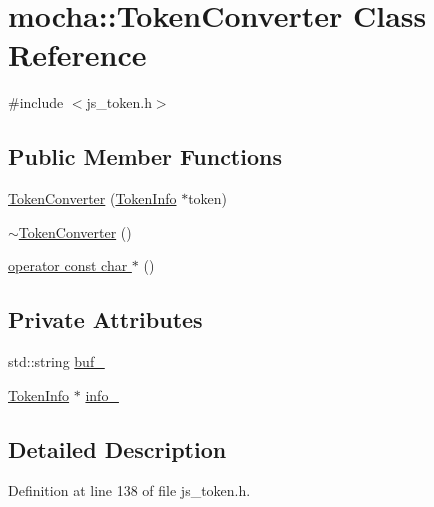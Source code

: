 \hypertarget{classmocha_1_1_token_converter}{
\section{mocha::TokenConverter Class Reference}
\label{classmocha_1_1_token_converter}
}


{\ttfamily \#include $<$js\_\-token.h$>$}

\subsection*{Public Member Functions}
\begin{DoxyCompactItemize}
\item 
\hyperlink{classmocha_1_1_token_converter_a6f0ddfb5239147501729f2044cb496db}{TokenConverter} (\hyperlink{classmocha_1_1_token_info}{TokenInfo} $\ast$token)
\item 
\hyperlink{classmocha_1_1_token_converter_acccd6eeaefe45af08e9984298b030428}{$\sim$TokenConverter} ()
\item 
\hyperlink{classmocha_1_1_token_converter_a88e2c050542a40ff94fdd19f3f54b089}{operator const char $\ast$} ()
\end{DoxyCompactItemize}
\subsection*{Private Attributes}
\begin{DoxyCompactItemize}
\item 
std::string \hyperlink{classmocha_1_1_token_converter_a8f43e8c3e0219337187ac5d080c8eaf7}{buf\_\-}
\item 
\hyperlink{classmocha_1_1_token_info}{TokenInfo} $\ast$ \hyperlink{classmocha_1_1_token_converter_adb33fad25e24a7f086559c627ff42dda}{info\_\-}
\end{DoxyCompactItemize}


\subsection{Detailed Description}


Definition at line 138 of file js\_\-token.h.



